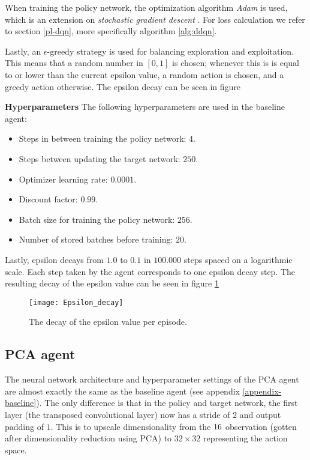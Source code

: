 When training the policy network, the optimization algorithm \emph{Adam} is used, which is an extension on \emph{stochastic gradient descent} \cite{adam}. For loss calculation we refer to section \ref{pl-dqn}, more specifically algorithm \ref{alg:ddqn}.

Lastly, an $\epsilon$-greedy strategy is used for balancing exploration and exploitation. This means that a random number in $[0,1]$ is chosen; whenever this is is equal to or lower than the current epsilon value, a random action is chosen, and a greedy action otherwise. The epsilon decay can be seen in figure %

\noindent\textbf{Hyperparameters}\newline
\noindent The following hyperparameters are used in the baseline agent:
\begin{itemize}
\item Steps in between training the policy network: $4$.
\item Steps between updating the target network: $250$.
\item Optimizer learning rate: $0.0001$.
\item Discount factor: $0.99$.
\item Batch size for training the policy network: $256$.
\item Number of stored batches before training: $20$.
\end{itemize}

Lastly, epsilon decays from $1.0$ to $0.1$ in $100.000$ steps spaced on a logarithmic scale. Each step taken by the agent corresponds to one epsilon decay step. The resulting decay of the epsilon value can be seen in figure \ref{fig:epsilon}

\begin{figure}[h]
    \centering
    \texttt{[image: Epsilon\_decay]}
    \caption{The decay of the epsilon value per episode.}
    \label{fig:epsilon}
\end{figure}

\subsection{PCA agent}
The neural network architecture and hyperparameter settings of the PCA agent are almost exactly the same as the baseline agent (see appendix \ref{appendix-baseline}). The only difference is that in the policy and target network, the first layer (the transposed convolutional layer) now has a stride of $2$ and output padding of $1$. This is to upscale dimensionality from the $16 \time 16$ observation (gotten after dimensionality reduction using PCA) to $32 \times 32$ representing the action space.


